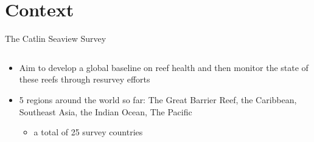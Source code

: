 \documentclass{beamer}
\begin{document}
    \section{Context}
        \begin{frame}{The Catlin Seaview Survey}
          \begin{columns}[T]
            \begin{column}{0.45\textwidth}
              \begin{itemize}
                \item Aim to develop a global baseline on reef health and then monitor the state of these reefs through resurvey efforts
                \item 5 regions around the world so far: The Great Barrier Reef, the Caribbean, Southeast Asia, the Indian Ocean, The Pacific
                  \begin{itemize}
                    \item a total of 25 survey countries
                  \end{itemize}
              \end{itemize}
            \end{column}


\end{columns}
\end{frame}
\end{document}
